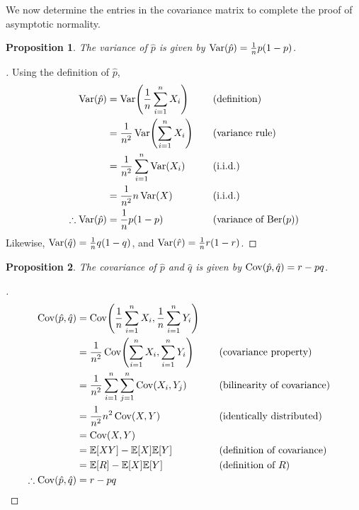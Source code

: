\documentclass[letterpaper, reqno]{amsart}
\newtheorem{prop}{Proposition}[section]
\renewcommand{\qedsymbol}{\ensuremath{\blacksquare}}
\newenvironment{subproof}[1][\proofname]{%
  \renewcommand{\qedsymbol}{\ensuremath{\square}}%
  \begin{proof}[#1]%
}{%
  \end{proof}%
}
\numberwithin{equation}{section}
\newcommand{\E}[1]{\mathbb{E}\mleft[#1\mright]}
\newcommand{\Var}[1]{\operatorname{Var}\mleft(#1\mright)}
\newcommand{\Cov}[1]{\operatorname{Cov}\mleft(#1\mright)}
\newcommand{\iid}{i.i.d.}
\newcommand{\sumi}[2]{\sum_{#1=1}^{#2}}
\newcommand{\avg}[2]{\frac{1}{#2}\sumi{#1}{#2}}
\newcommand{\by}[1]{&\quad&\text{(#1)}}
\newcommand{\phat}{\hat{p}}
\newcommand{\qhat}{\hat{q}}
\newcommand{\rhat}{\hat{r}}
\DeclareMathOperator{\Ber}{Ber}
\begin{document}
We now determine the entries in the covariance matrix to complete the proof of
asymptotic normality.
\begin{prop}
The variance of $\phat$ is given by $\Var{\phat} = \frac{1}{n} p(1 - p)$.
\end{prop}
\begin{subproof}
  Using the definition of $\phat$,
  \begin{alignat*}{3}
    \Var{\phat} &= \Var{\avg{i}{n} X_i} \by{definition} \\
                &= \frac{1}{n^2}\Var{\sumi{i}{n} X_i} \by{variance rule} \\
                &= \frac{1}{n^2}\sumi{i}{n}\Var{X_i} \by{\iid} \\
                &= \frac{1}{n^2}n\Var{X} \by{\iid} \\
   \therefore \Var{\phat} &= \frac{1}{n} p(1-p) \by{variance of $\Ber(p)$}
  \end{alignat*}
  Likewise, $\Var{\qhat} = \frac{1}{n} q(1 - q)$,
  and $\Var{\rhat} = \frac{1}{n} r(1 - r)$.
\end{subproof}

\begin{prop}
  The covariance of $\phat$ and $\qhat$ is given by $\Cov{\phat, \qhat} = r - pq$.
\end{prop}
\begin{subproof}
  \begin{alignat*}{3}
    \Cov{\phat, \qhat} &= \Cov{\avg{i}{n} X_i, \avg{i}{n} Y_i} \\
    &= \frac{1}{n^2} \Cov{\sumi{i}{n} X_i, \sumi{i}{n} Y_i} \by{covariance property} \\
    &= \frac{1}{n^2} \sumi{i}{n} \sumi{j}{n} \Cov{X_i, Y_j} \by{bilinearity of covariance} \\
    &= \frac{1}{n^2} n^2 \Cov{X, Y} \by{identically distributed} \\
    &= \Cov{X, Y}  \\
    &= \E{XY} - \E{X}\E{Y} \by{definition of covariance} \\
    &= \E{R} - \E{X}\E{Y} \by{definition of $R$} \\
    \therefore \Cov{\phat, \qhat} &= r - pq \tag*{\qedhere}
  \end{alignat*}
\end{subproof}
\end{document}
